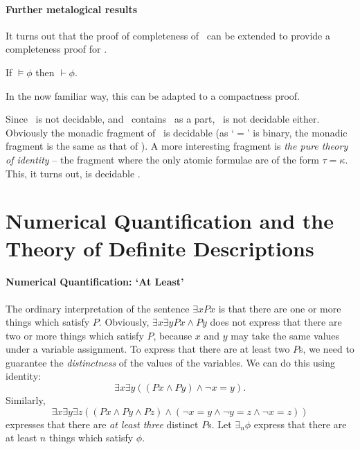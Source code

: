 \paragraph{Further metalogical results}

It turns out that the proof of completeness of \ltwo\ can be extended to provide a completeness proof for \lequ. \begin{theorem}
	If $\vDash \phi$ then $\vdash \phi$.
\end{theorem}
In the now familiar way, this can be adapted to a compactness proof.

Since \ltwo\ is not decidable, and \lequ\ contains \ltwo\ as a part, \lequ\ is not decidable either. Obviously the monadic fragment of \lequ\ is decidable (as `$=$' is binary, the monadic fragment is the same as that of \ltwo). A more interesting fragment is \emph{the pure theory of identity} – the fragment where the only atomic formulae are of the form $\tau=\kappa$. This, it turns out, is decidable \citep[329--31]{bosintlo}. 


% 
% 
% 
% 
% 
% 
% 


\section{Numerical Quantification and the Theory of Definite Descriptions}
\paragraph{Numerical Quantification: `At Least'}

The ordinary interpretation of the sentence $\exists x Px$ is that there are one or more things which satisfy $P$. Obviously, $\exists x \exists y Px \wedge Py$ does not express that there are two or more things which satisfy $P$, because $x$ and $y$ may take the same values under a variable assignment. To express that there are at least two $P$s, we need to guarantee the \emph{distinctness} of the values of the variables. We can do this using identity: \begin{equation*}
	\exists x \exists y ((Px \wedge Py) \wedge \neg x=y).
\end{equation*}
  Similarly, \begin{equation*}
  	\exists x \exists y \exists z ((Px \wedge Py \wedge Pz)\wedge (\neg x=y \wedge \neg y=z \wedge \neg x=z))
  \end{equation*} expresses that there are \emph{at least three} distinct $P$s. Let $\exists_{n}\phi$ express that there are at least $n$ things which satisfy $\phi$.

